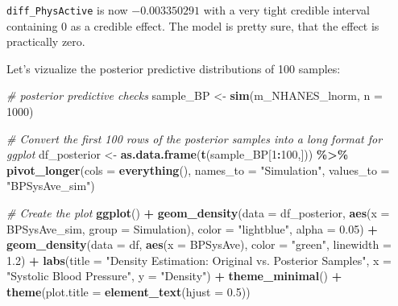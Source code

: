 \documentclass[
]{book}
\newenvironment{Shaded}{\begin{snugshade}}{\end{snugshade}}
\newcommand{\AttributeTok}[1]{\textcolor[rgb]{0.13,0.29,0.53}{#1}}
\newcommand{\CommentTok}[1]{\textcolor[rgb]{0.56,0.35,0.01}{\textit{#1}}}
\newcommand{\DecValTok}[1]{\textcolor[rgb]{0.00,0.00,0.81}{#1}}
\newcommand{\FloatTok}[1]{\textcolor[rgb]{0.00,0.00,0.81}{#1}}
\newcommand{\FunctionTok}[1]{\textcolor[rgb]{0.13,0.29,0.53}{\textbf{#1}}}
\newcommand{\NormalTok}[1]{#1}
\newcommand{\OtherTok}[1]{\textcolor[rgb]{0.56,0.35,0.01}{#1}}
\newcommand{\SpecialCharTok}[1]{\textcolor[rgb]{0.81,0.36,0.00}{\textbf{#1}}}
\newcommand{\StringTok}[1]{\textcolor[rgb]{0.31,0.60,0.02}{#1}}
\begin{document}
\texttt{diff\_PhysActive} is now \(-0.003350291\) with a very tight credible interval
containing \(0\) as a credible effect. The model is pretty sure, that the effect
is practically zero.

Let's vizualize the posterior predictive distributions of 100 samples:

\begin{Shaded}
\begin{Highlighting}[]
\CommentTok{\# posterior predictive checks}
\NormalTok{sample\_BP }\OtherTok{\textless{}{-}} \FunctionTok{sim}\NormalTok{(m\_NHANES\_lnorm, }\AttributeTok{n =} \DecValTok{1000}\NormalTok{)}

\CommentTok{\# Convert the first 100 rows of the posterior samples into a long format for ggplot}
\NormalTok{df\_posterior }\OtherTok{\textless{}{-}} \FunctionTok{as.data.frame}\NormalTok{(}\FunctionTok{t}\NormalTok{(sample\_BP[}\DecValTok{1}\SpecialCharTok{:}\DecValTok{100}\NormalTok{,])) }\SpecialCharTok{\%\textgreater{}\%}
  \FunctionTok{pivot\_longer}\NormalTok{(}\AttributeTok{cols =} \FunctionTok{everything}\NormalTok{(), }\AttributeTok{names\_to =} \StringTok{"Simulation"}\NormalTok{, }\AttributeTok{values\_to =} \StringTok{"BPSysAve\_sim"}\NormalTok{)}

\CommentTok{\# Create the plot}
\FunctionTok{ggplot}\NormalTok{() }\SpecialCharTok{+}
  \FunctionTok{geom\_density}\NormalTok{(}\AttributeTok{data =}\NormalTok{ df\_posterior, }\FunctionTok{aes}\NormalTok{(}\AttributeTok{x =}\NormalTok{ BPSysAve\_sim, }\AttributeTok{group =}\NormalTok{ Simulation), }
               \AttributeTok{color =} \StringTok{"lightblue"}\NormalTok{, }\AttributeTok{alpha =} \FloatTok{0.05}\NormalTok{) }\SpecialCharTok{+}
  \FunctionTok{geom\_density}\NormalTok{(}\AttributeTok{data =}\NormalTok{ df, }\FunctionTok{aes}\NormalTok{(}\AttributeTok{x =}\NormalTok{ BPSysAve), }\AttributeTok{color =} \StringTok{"green"}\NormalTok{, }\AttributeTok{linewidth =} \FloatTok{1.2}\NormalTok{) }\SpecialCharTok{+}
  \FunctionTok{labs}\NormalTok{(}\AttributeTok{title =} \StringTok{"Density Estimation: Original vs. Posterior Samples"}\NormalTok{,}
       \AttributeTok{x =} \StringTok{"Systolic Blood Pressure"}\NormalTok{,}
       \AttributeTok{y =} \StringTok{"Density"}\NormalTok{) }\SpecialCharTok{+}
  \FunctionTok{theme\_minimal}\NormalTok{() }\SpecialCharTok{+}
  \FunctionTok{theme}\NormalTok{(}\AttributeTok{plot.title =} \FunctionTok{element\_text}\NormalTok{(}\AttributeTok{hjust =} \FloatTok{0.5}\NormalTok{))}
\end{Highlighting}
\end{Shaded}
\end{document}

